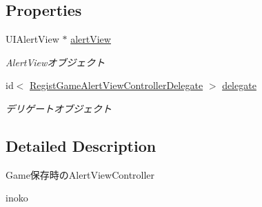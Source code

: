 \subsection*{Properties}
\begin{DoxyCompactItemize}
\item 
\hypertarget{interface_regist_game_alert_view_controller_aa1c5f6ff83878af49523d1985fc07afb}{
UIAlertView $\ast$ \hyperlink{interface_regist_game_alert_view_controller_aa1c5f6ff83878af49523d1985fc07afb}{alertView}}
\label{interface_regist_game_alert_view_controller_aa1c5f6ff83878af49523d1985fc07afb}

\begin{DoxyCompactList}\small\item\em AlertViewオブジェクト \end{DoxyCompactList}\item 
\hypertarget{interface_regist_game_alert_view_controller_a1ea9e446ea0634d2fdf109e8651a5faf}{
id$<$ \hyperlink{protocol_regist_game_alert_view_controller_delegate-p}{RegistGameAlertViewControllerDelegate} $>$ \hyperlink{interface_regist_game_alert_view_controller_a1ea9e446ea0634d2fdf109e8651a5faf}{delegate}}
\label{interface_regist_game_alert_view_controller_a1ea9e446ea0634d2fdf109e8651a5faf}

\begin{DoxyCompactList}\small\item\em デリゲートオブジェクト \end{DoxyCompactList}\end{DoxyCompactItemize}


\subsection{Detailed Description}
Game保存時のAlertViewController

inoko 

